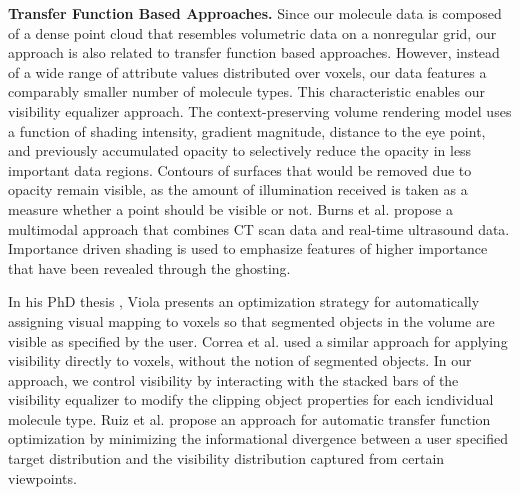 \noindent
\textbf{Transfer Function Based Approaches.}
Since our molecule data is composed of a dense point cloud that resembles volumetric data on a nonregular grid, our approach is also related to transfer function based approaches.
However, instead of a wide range of attribute values distributed over voxels, our data features a comparably smaller number of molecule types. This characteristic enables our visibility equalizer approach. %
The context-preserving volume rendering model \cite{Bruckner05} uses a function of shading intensity, gradient magnitude, distance to the eye point, and previously accumulated opacity to selectively reduce the opacity in less important data regions. Contours of surfaces that would be removed due to opacity remain visible, as the amount of illumination received is taken as a measure whether a point should be visible or not.
Burns et al. \cite{Burns07} propose a multimodal approach that combines CT scan data and real-time ultrasound data. Importance driven shading is used to emphasize features of higher importance that have been revealed through the ghosting.

In his PhD thesis \cite{phd-viola}, Viola presents an optimization strategy for automatically assigning visual mapping to voxels so that segmented objects in the volume are visible as specified by the user. Correa et al. \cite{correa11} used a similar approach for applying visibility directly to voxels, without the notion of segmented objects.
In our approach, we control visibility by interacting with the stacked bars of the visibility equalizer to modify the clipping object properties for each icndividual molecule type.
Ruiz et al. \cite{ruiz11} propose an approach for automatic transfer function optimization by minimizing the informational divergence between a user specified target distribution and the visibility distribution captured from certain viewpoints. 

